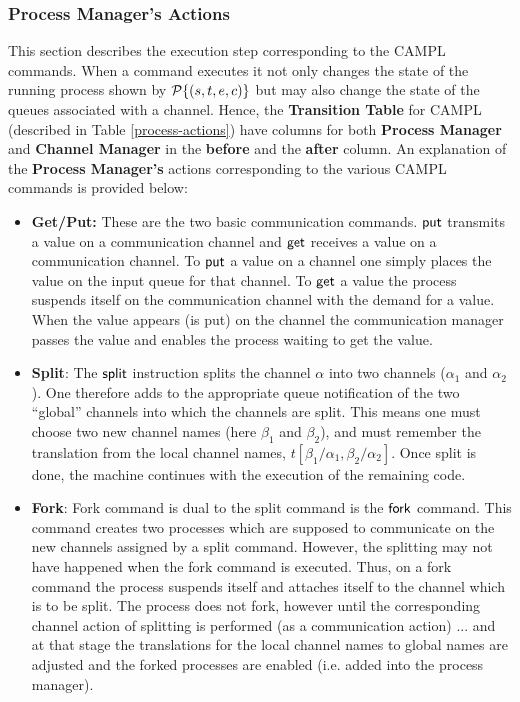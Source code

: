 \documentclass[11pt]{article}
\newcommand{\<}{\langle}
\renewcommand{\>}{\rangle}
\begin{document}
\subsubsection{Process Manager's Actions}{\label{process-manager}}
This section describes the execution step corresponding to the CAMPL commands. When a command executes it not only changes the state of the running process shown by ${\cal P}\{ (s,t,e,c)\}$ but may also change the state of the queues associated with a channel. Hence, the {\bf Transition Table} for CAMPL (described in Table \ref {process-actions}) have columns for both {\bf Process Manager} and {\bf Channel Manager} in the {\bf before} and the {\bf after} column.
An explanation of the {\bf Process Manager's} actions corresponding to the various CAMPL commands is provided below:
\begin{itemize}
\item {\bf Get/Put:} These are the two basic communication commands. ${\sf put}$ transmits a value on a communication channel and ${\sf get}$ receives a value on a communication channel.  To ${\sf put}$ a value on a channel one simply 
places the value on the input queue for that channel. To ${\sf get}$ a value the process suspends itself on the communication channel with the demand for a value.   When the value appears (is put) on the channel the communication manager  
passes the value and enables the process waiting to get the value.

\item {\bf Split}: The ${\sf split}$ instruction splits the channel $\alpha$ into two channels ($\alpha_1$ and $\alpha_2$).  One therefore adds to the appropriate queue notification of the two ``global'' channels into which the channels are split. This means one must choose two new channel names (here $\beta_1$ and $\beta_2$), and must remember the translation from the local channel names, $t[\beta_1/\alpha_1,\beta_2/\alpha_2]$. Once {\sf split} is done, the machine continues with the execution of the remaining code.    

\item {\bf Fork}: {\sf Fork} command is dual to the {\sf split} command is the ${\sf fork}$ command.  This command creates two processes which are supposed to communicate on the new channels assigned by a  split command. However, the splitting may not have happened when the fork command is executed. Thus, on a fork command the process suspends itself and attaches itself to the channel which is to be split. The process does not fork, however 
until the corresponding channel action of splitting is performed (as a communication action)  ... and at that stage the translations for the local channel names to global names are adjusted and the forked processes are 
enabled (i.e. added into the process manager).


\end{itemize}
\end{document}
